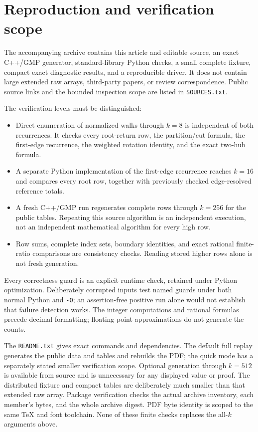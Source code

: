 \documentclass[11pt,letterpaper]{article}
\theoremstyle{remark}\newtheorem{remark}[theorem]{Remark}
\theoremstyle{definition}\newtheorem{definition}[theorem]{Definition}
\begin{document}
\section{Reproduction and verification scope}\label{sgm:dv:sec:reproduction}
The accompanying archive contains this article and editable source, an exact C++/GMP generator, standard-library Python checks, a small complete fixture, compact exact diagnostic results, and a reproducible driver. It does not contain large extended raw arrays, third-party papers, or review correspondence. Public source links and the bounded inspection scope are listed in \texttt{SOURCES.txt}.

The verification levels must be distinguished:
\begin{itemize}
\item Direct enumeration of normalized walks through $k=8$ is independent of both recurrences. It checks every root-return row, the partition/cut formula, the first-edge recurrence, the weighted rotation identity, and the exact two-hub formula.
\item A separate Python implementation of the first-edge recurrence reaches $k=16$ and compares every root row, together with previously checked edge-resolved reference totals.
\item A fresh C++/GMP run regenerates complete rows through $k=256$ for the public tables. Repeating this source algorithm is an independent execution, not an independent mathematical algorithm for every high row.
\item Row sums, complete index sets, boundary identities, and exact rational finite-ratio comparisons are consistency checks. Reading stored higher rows alone is not fresh generation.
\end{itemize}
Every correctness guard is an explicit runtime check, retained under Python optimization. Deliberately corrupted inputs test named guards under both normal Python and \texttt{-O}; an assertion-free positive run alone would not establish that failure detection works. The integer computations and rational formulas precede decimal formatting; floating-point approximations do not generate the counts.

The \texttt{README.txt} gives exact commands and dependencies. The default full replay generates the public data and tables and rebuilds the PDF; the quick mode has a separately stated smaller verification scope. Optional generation through $k=512$ is available from source and is unnecessary for any displayed value or proof. The distributed fixture and compact tables are deliberately much smaller than that extended raw array. Package verification checks the actual archive inventory, each member's bytes, and the whole archive digest. PDF byte identity is scoped to the same TeX and font toolchain. None of these finite checks replaces the all-$k$ arguments above.
\end{document}

